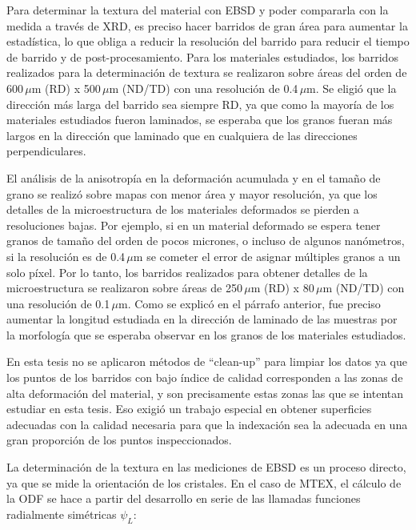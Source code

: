 Para determinar la textura del material con EBSD y poder compararla con la medida a través de XRD, es preciso hacer barridos de gran área para aumentar la estadística, lo que obliga a reducir la resolución del barrido para reducir el tiempo de barrido y de post-procesamiento.
Para los materiales estudiados, los barridos realizados para la determinación de textura se realizaron sobre áreas del orden de 600\,$\mu$m (RD) x 500\,$\mu$m (ND/TD) con una resolución de 0.4\,$\mu$m.
Se eligió que la dirección más larga del barrido sea siempre RD, ya que como la mayoría de los materiales estudiados fueron laminados, se esperaba que los granos fueran más largos en la dirección que laminado que en cualquiera de las direcciones perpendiculares.

El análisis de la anisotropía en la deformación acumulada y en el tamaño de grano se realizó sobre mapas con menor área y mayor resolución, ya que los detalles de la microestructura de los materiales deformados se pierden a resoluciones bajas.
Por ejemplo, si en un material deformado se espera tener granos de tamaño del orden de pocos micrones, o incluso de algunos nanómetros, si la resolución es de 0.4\,$\mu$m se cometer el error de asignar múltiples granos a un solo píxel.
Por lo tanto, los barridos realizados para obtener detalles de la microestructura se realizaron sobre áreas de 250\,$\mu$m (RD) x 80\,$\mu$m (ND/TD) con una resolución de 0.1\,$\mu$m.
Como se explicó en el párrafo anterior, fue preciso aumentar la longitud estudiada en la dirección de laminado de las muestras por la morfología que se esperaba observar en los granos de los materiales estudiados.

En esta tesis no se aplicaron métodos de “clean-up” para limpiar los datos ya que los puntos de los barridos con bajo índice de calidad corresponden a las zonas de alta deformación del material, y son precisamente estas zonas las que se intentan estudiar en esta tesis. 
Eso exigió un trabajo especial en obtener superficies adecuadas con la calidad necesaria para que la indexación sea la adecuada en una gran proporción de los puntos inspeccionados.

La determinación de la textura en las mediciones de EBSD es un proceso directo, ya que se mide la orientación de los cristales.
En el caso de MTEX, el cálculo de la ODF se hace a partir del desarrollo en serie de las llamadas funciones radialmente simétricas $\psi_L$:


